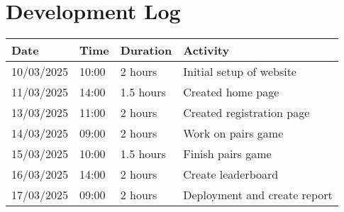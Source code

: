 \documentclass{article}
\begin{document}
\section{Development Log}
\begin{table}[H]
    \centering
    \begin{tabular}{llll}
        \toprule
        \textbf{Date} & \textbf{Time} & \textbf{Duration} & \textbf{Activity}            \\
        \midrule
        10/03/2025    & 10:00         & 2 hours           & Initial setup of website     \\
        11/03/2025    & 14:00         & 1.5 hours         & Created home page            \\
        13/03/2025    & 11:00         & 2 hours           & Created registration page    \\
        14/03/2025    & 09:00         & 2 hours           & Work on pairs game           \\
        15/03/2025    & 10:00         & 1.5 hours         & Finish pairs game            \\
        16/03/2025    & 14:00         & 2 hours           & Create leaderboard           \\
        17/03/2025    & 09:00         & 2 hours           & Deployment and create report \\
        \bottomrule
    \end{tabular}
\end{table}
\end{document}
